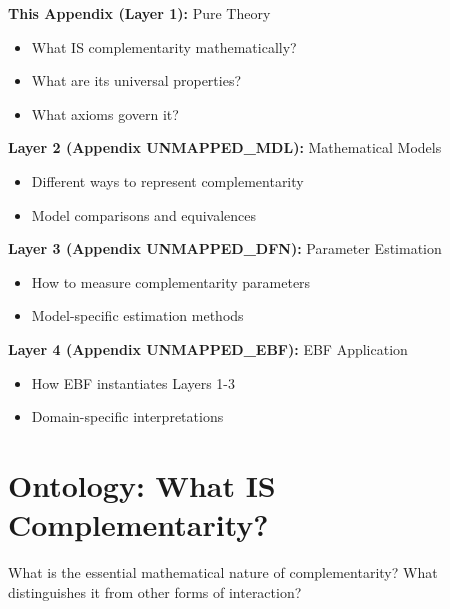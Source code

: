 \begin{tcolorbox}[colback=gray!5!white,colframe=gray!75!black,title=\textbf{Architectural Position}]
\small
\textbf{This Appendix (Layer 1):} Pure Theory
\begin{itemize}[noitemsep]
    \item What IS complementarity mathematically?
    \item What are its universal properties?
    \item What axioms govern it?
\end{itemize}

\textbf{Layer 2 (Appendix UNMAPPED_MDL):} Mathematical Models
\begin{itemize}[noitemsep]
    \item Different ways to represent complementarity
    \item Model comparisons and equivalences
\end{itemize}

\textbf{Layer 3 (Appendix UNMAPPED_DFN):} Parameter Estimation
\begin{itemize}[noitemsep]
    \item How to measure complementarity parameters
    \item Model-specific estimation methods
\end{itemize}

\textbf{Layer 4 (Appendix UNMAPPED_EBF):} EBF Application
\begin{itemize}[noitemsep]
    \item How EBF instantiates Layers 1-3
    \item Domain-specific interpretations
\end{itemize}
\end{tcolorbox}

\section{Ontology: What IS Complementarity?}
\label{sec:ontology}

\begin{tcolorbox}[colback=red!5!white,colframe=red!75!black,title=\textbf{Fundamental Question}]
What is the essential mathematical nature of complementarity? What distinguishes it from other forms of interaction?
\end{tcolorbox}

